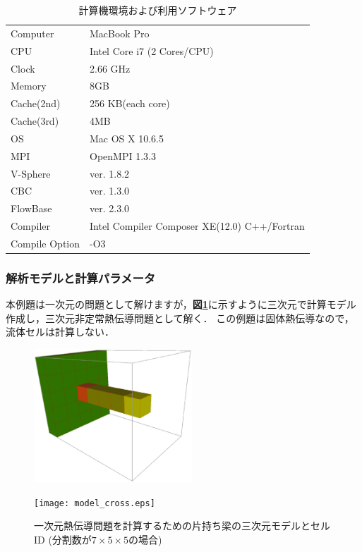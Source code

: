 \begin{table}[htdp]
\small
\caption{計算機環境および利用ソフトウェア}
\begin{center}
\begin{tabular}{ll}\toprule
Computer & MacBook Pro\\
CPU & Intel Core i7 (2 Cores/CPU)\\
Clock & 2.66 GHz\\
Memory & 8GB\\
Cache(2nd) & 256 KB(each core)\\
Cache(3rd) & 4MB\\ 
OS & Mac OS X 10.6.5\\ \hline
MPI & OpenMPI 1.3.3\\
V-Sphere & ver. 1.8.2\\
CBC & ver. 1.3.0\\
FlowBase & ver. 2.3.0\\ \hline
Compiler & Intel Compiler Composer XE(12.0) C++/Fortran\\
Compile Option & -O3\\
\bottomrule
\end{tabular}
\end{center}
\label{tbl: shc1d env}
\end{table}


%
\subsubsection{解析モデルと計算パラメータ}

本例題は一次元の問題として解けますが，\textbf{図\ref{fig:HC model}}に示すように三次元で計算モデル作成し，三次元非定常熱伝導問題として解く．
この例題は固体熱伝導なので，流体セルは計算しない．

\begin{figure}[htdp]
\begin{minipage}{0.47\hsize}
\begin{center}
\includegraphics[height=5cm,clip]{model_iso.eps}
\end{center}
\end{minipage}
\begin{minipage}{0.47\hsize}
\begin{center}
\texttt{[image: model\_cross.eps]}
\end{center}
\end{minipage}
\caption{一次元熱伝導問題を計算するための片持ち梁の三次元モデルとセルID (分割数が$7\times5\times5$の場合)}
\label{fig:HC model}
\end{figure}

